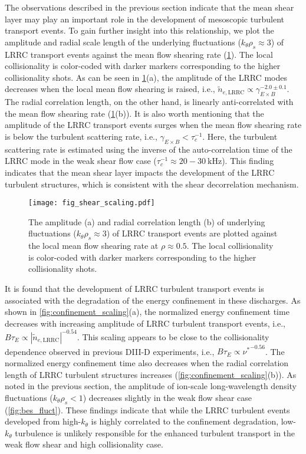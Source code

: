 \documentclass[english,aip,pop,superscriptaddress,preprint,letterpaper]{revtex4-2}
\begin{document}
The observations described in the previous section indicate that the mean shear layer may play an important role in the development of mesoscopic turbulent transport events.
To gain further insight into this relationship, we plot the amplitude and radial scale length of the underlying fluctuations ($k_{\theta}\rho_{s}\approx3$) of LRRC transport events against the mean flow shearing rate (\cref{fig:shear_scaling}).
The local collisionality is color-coded with darker markers corresponding to the higher collisionality shots.
As can be seen in \cref{fig:shear_scaling}(a), the amplitude of the LRRC modes decreases when the local mean flow shearing is raised, i.e., $\tilde{n}_{e,\mathrm{LRRC}}\propto\gamma_{E \times B}^{-2.0\pm0.1}$.
The radial correlation length, on the other hand, is linearly anti-correlated with the mean flow shearing rate (\cref{fig:shear_scaling}(b)).
It is also worth mentioning that the amplitude of the LRRC transport events surges when the mean flow shearing rate is below the turbulent scattering rate, i.e., $\gamma_{E\times B}<\tau_{c}^{-1}$.
Here, the turbulent scattering rate is estimated using the inverse of the auto-correlation time of the LRRC mode in the weak shear flow case ($\tau_{c}^{-1}\approx20-\SI{30}{\kilo\hertz}$).
This finding indicates that the mean shear layer impacts the development of the LRRC turbulent structures, which is consistent with the shear decorrelation mechanism.

\begin{figure}
  \texttt{[image: fig\_shear\_scaling.pdf]}
  \caption{\label{fig:shear_scaling} The amplitude (a) and radial correlation length (b) of underlying fluctuations ($k_{\theta}\rho_{s}\approx3$) of LRRC transport events are plotted against the local mean flow shearing rate at $\rho\approx0.5$. The local collisionality is color-coded with darker markers corresponding to the higher collisionality shots.}
\end{figure}

It is found that the development of LRRC turbulent transport events is associated with the degradation of the energy confinement in these discharges.
As shown in \cref{fig:confinement_scaling}(a), the normalized energy confinement time decreases with increasing amplitude of LRRC turbulent transport events, i.e., $B\tau_{E}\propto|\tilde{n}_{e,\mathrm{LRRC}}|^{-0.54}$.
This scaling appears to be close to the collisionality dependence observed in previous DIII-D experiments, \cite{pettyScalingHeatTransport1999} i.e., $B\tau_{E}\propto{\nu^{*}}^{-0.56}$.
The normalized energy confinement time also decreases when the radial correlation length of LRRC turbulent structures increases (\cref{fig:confinement_scaling}(b)).
As noted in the previous section, the amplitude of ion-scale long-wavelength density fluctuations ($k_{\theta}\rho_{s}<1$) decreases slightly in the weak flow shear case (\cref{fig:bes_fluct}).
These findings indicate that while the LRRC turbulent events developed from high-$k_{\theta}$ is highly correlated to the confinement degradation, low-$k_{\theta}$ turbulence is unlikely responsible for the enhanced turbulent transport in the weak flow shear and high collisionality case.
\end{document}
